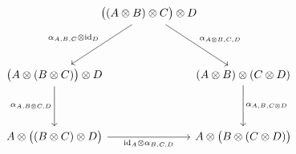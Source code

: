 \documentclass[border=6pt]{standalone}
\newcommand{\id}{\mathrm{id}}
\begin{document}
$
\begin{tikzcd}[column sep=-1.0em, row sep=huge]
  & \bigl((A \otimes B) \otimes C\bigr) \otimes D
    \arrow[dl, "\alpha_{A,B,C} \otimes \id_D"']
    \arrow[dr, "\alpha_{A \otimes B, C, D}"] & \\
  \bigl(A \otimes (B \otimes C)\bigr) \otimes D
    \arrow[d, "\alpha_{A, B \otimes C, D}"'] & &
  (A \otimes B) \otimes (C \otimes D)
    \arrow[d, "\alpha_{A,B,C \otimes D}"] \\
  A \otimes \bigl((B \otimes C) \otimes D\bigr)
    \arrow[rr, "\id_A \otimes \alpha_{B,C,D}"'] & &
  A \otimes \bigl(B \otimes (C \otimes D)\bigr)
\end{tikzcd}
$
\end{document}
